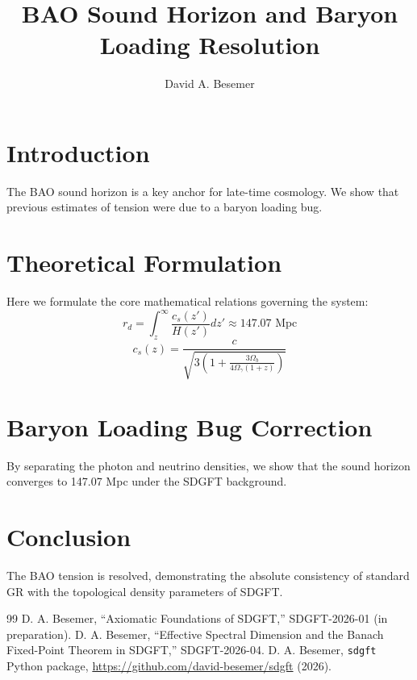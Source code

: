\documentclass[a4paper,11pt]{article}
\begin{document}
\title{BAO Sound Horizon and Baryon Loading Resolution}

\author{David A. Besemer}



\maketitle

\section{Introduction}
The BAO sound horizon is a key anchor for late-time cosmology. We show that previous estimates of tension were due to a baryon loading bug.

\section{Theoretical Formulation}
Here we formulate the core mathematical relations governing the system:
\begin{equation}
  r_d = \int_z^\infty \frac{c_s(z')}{H(z')} dz' \approx 147.07 \text{ Mpc}
\end{equation}
\begin{equation}
  c_s(z) = \frac{c}{\sqrt{3\left(1 + \frac{3\Omega_b}{4\Omega_\gamma(1+z)}\right)}}
\end{equation}
\section{Baryon Loading Bug Correction}
By separating the photon and neutrino densities, we show that the sound horizon converges to 147.07 Mpc under the SDGFT background.

\section{Conclusion}
The BAO tension is resolved, demonstrating the absolute consistency of standard GR with the topological density parameters of SDGFT.



\begin{thebibliography}{99}
 D. A. Besemer, ``Axiomatic Foundations of SDGFT,'' SDGFT-2026-01 (in preparation).
 D. A. Besemer, ``Effective Spectral Dimension and the Banach Fixed-Point Theorem in SDGFT,'' SDGFT-2026-04.
 D. A. Besemer, \texttt{sdgft} Python package, \url{https://github.com/david-besemer/sdgft} (2026).
\end{thebibliography}
\end{document}
